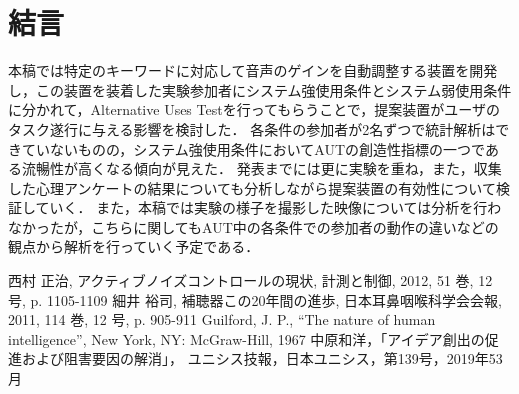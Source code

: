\documentclass[a4paper]{jarticle}
\begin{document}
\section{結言}
本稿では特定のキーワードに対応して音声のゲインを自動調整する装置を開発し，この装置を装着した実験参加者にシステム強使用条件とシステム弱使用条件に分かれて，Alternative Uses Testを行ってもらうことで，提案装置がユーザのタスク遂行に与える影響を検討した．
各条件の参加者が2名ずつで統計解析はできていないものの，システム強使用条件においてAUTの創造性指標の一つである流暢性が高くなる傾向が見えた．
発表までには更に実験を重ね，また，収集した心理アンケートの結果についても分析しながら提案装置の有効性について検証していく．
また，本稿では実験の様子を撮影した映像については分析を行わなかったが，こちらに関してもAUT中の各条件での参加者の動作の違いなどの観点から解析を行っていく予定である．
%
%
\begin{thebibliography}{99}
西村 正治, アクティブノイズコントロールの現状, 計測と制御, 2012, 51 巻, 12 号, p. 1105-1109
細井 裕司, 補聴器この20年間の進歩, 日本耳鼻咽喉科学会会報, 2011, 114 巻, 12 号, p. 905-911
Guilford, J. P., “The nature of human intelligence”, New York, NY: McGraw-Hill,
1967
中原和洋，「アイデア創出の促進および阻害要因の解消」，
ユニシス技報，日本ユニシス，第139号，2019年53月
\end{thebibliography}
%
%
%
\end{document}
